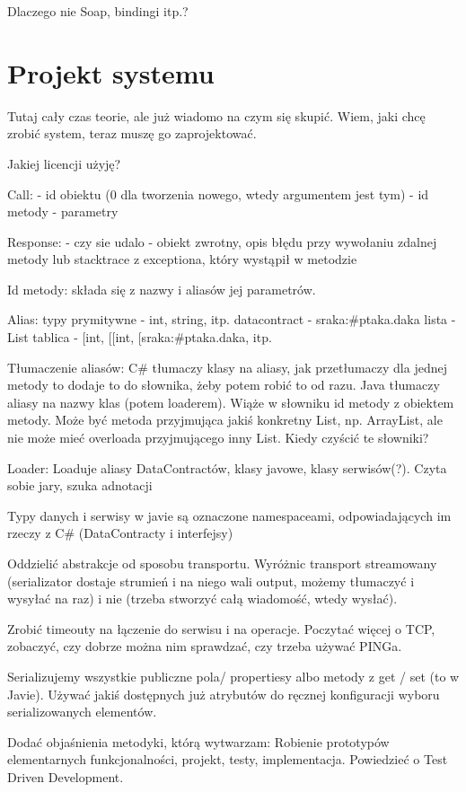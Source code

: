 \documentclass[twoside,a4paper]{book}
\begin{document}
Dlaczego nie Soap, bindingi itp.?

\chapter{Projekt systemu}
Tutaj cały czas teorie, ale już wiadomo na czym się skupić. Wiem, jaki chcę zrobić system, teraz muszę go zaprojektować.

Jakiej licencji użyję?

Call:
- id obiektu (0 dla tworzenia nowego, wtedy argumentem jest tym)
- id metody
- parametry

Response:
- czy sie udalo
- obiekt zwrotny, opis błędu przy wywołaniu zdalnej metody lub stacktrace z exceptiona, który wystąpił w metodzie

Id metody:
składa się z nazwy i aliasów jej parametrów.

Alias:
typy prymitywne - int, string, itp.
datacontract - sraka:\#ptaka.daka
lista - List
tablica - [int, [[int, [sraka:\#ptaka.daka, itp.

Tłumaczenie aliasów:
C\# tłumaczy klasy na aliasy, jak przetłumaczy dla jednej metody to dodaje to do słownika, żeby potem robić to od razu.
Java tłumaczy aliasy na nazwy klas (potem loaderem). Wiąże w słowniku id metody z obiektem metody. Może być metoda przyjmująca jakiś konkretny List, np. ArrayList, ale nie może mieć overloada przyjmującego inny List.
Kiedy czyścić te słowniki?

Loader:
Loaduje aliasy DataContractów, klasy javowe, klasy serwisów(?). Czyta sobie jary, szuka adnotacji

Typy danych i serwisy w javie są oznaczone namespaceami, odpowiadających im rzeczy z C\# (DataContracty i interfejsy)

Oddzielić abstrakcje od sposobu transportu. Wyróżnic transport streamowany (serializator dostaje strumień i na niego wali output, możemy tłumaczyć i wysyłać na raz) i nie (trzeba stworzyć całą wiadomość, wtedy wysłać).

Zrobić timeouty na łączenie do serwisu i na operacje. Poczytać więcej o TCP, zobaczyć, czy dobrze można nim sprawdzać, czy trzeba używać PINGa.

Serializujemy wszystkie publiczne pola/ propertiesy albo metody z get / set (to w Javie). Używać jakiś dostępnych już atrybutów do ręcznej konfiguracji wyboru serializowanych elementów.

Dodać objaśnienia metodyki, którą wytwarzam:
Robienie prototypów elementarnych funkcjonalności, projekt, testy, implementacja. Powiedzieć o Test Driven Development.
\end{document}
